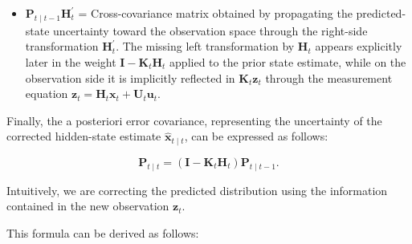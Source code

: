 \documentclass[11pt]{article}
\newcommand{\trans}{^{\prime}}
\begin{document}
\begin{itemize}
    \item $\mathbf{P}_{t\mid t-1}\mathbf{H}_t\trans$ = Cross-covariance matrix obtained by propagating the predicted-state uncertainty toward the observation space through the right-side transformation $\mathbf{H}_t\trans$. The missing left transformation by $\mathbf{H}_t$ appears explicitly later in the weight $\mathbf{I}-\mathbf{K}_t\mathbf{H}_t$ applied to the prior state estimate, while on the observation side it is implicitly reflected in $\mathbf{K}_t\mathbf{z}_t$ through the measurement equation $\mathbf{z}_t=\mathbf{H}_t\mathbf{x}_t+\mathbf{U}_t\mathbf{u}_t$.
\end{itemize}

Finally, the a posteriori error covariance, representing the uncertainty of the corrected hidden-state estimate $\widehat{\mathbf{x}}_{t\mid t}$, can be expressed as follows:

\[
\mathbf{P}_{t\mid t}
=
\left(
\mathbf{I}-\mathbf{K}_t\mathbf{H}_t
\right)
\mathbf{P}_{t\mid t-1}.
\]

Intuitively, we are correcting the predicted distribution using the information contained in the new observation $\mathbf{z}_t$.

This formula can be derived as follows:
\end{document}
